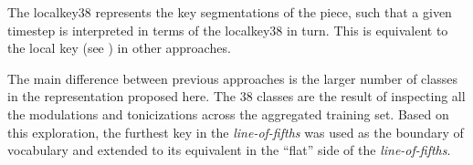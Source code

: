 
The \gls{localkey38} represents the key segmentations of the
piece, such that a given timestep is interpreted in terms of
the \gls{localkey38} in turn. This is equivalent to the
local key (see ) in other approaches.

The main difference between previous approaches is the
larger number of classes in the representation proposed
here. The 38 classes are the result of inspecting all the
modulations and tonicizations across the aggregated training
set. Based on this exploration, the furthest key in the
\emph{line-of-fifths} \parencite{temperley2000line} was used
as the boundary of vocabulary and extended to its equivalent
in the ``flat'' side of the \emph{line-of-fifths}.

